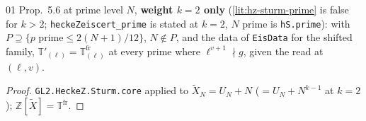 \begin{theorem}\label{inf:hz-sturmN}
  \leanok
  01 Prop.~5.6 at prime level $N$, \textbf{weight $k=2$ only} (\ref{lit:hz-sturm-prime} is false for $k>2$; \texttt{heckeZeiscert\_prime} is stated at $k=2$,
  $N$ prime is \texttt{hS.prime}): with $P\supseteq\{p\text{ prime}\le 2(N+1)/12\}$, $N\notin P$, and the data of \texttt{EisData} for the shifted family, $\mathbb T'_{(\ell)}=\mathbb T^{\mathrm{fr}}_{(\ell)}$ at every prime where $\ell^{v+1}\nmid g$, given the read at $(\ell,v)$.
\end{theorem}
\begin{proof}
  \leanok
  \texttt{GL2.HeckeZ.Sturm.core} applied to $\tilde X_N=U_N+N$ ($=U_N+N^{k-1}$ at $k=2$); $\mathbb Z[\tilde X]=\mathbb T^{\mathrm{fr}}$.
\end{proof}


